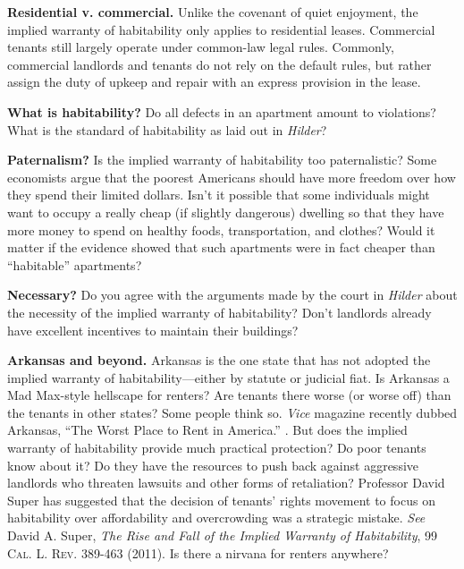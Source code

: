 
\item \textbf{Residential v. commercial.} Unlike the covenant of quiet
enjoyment, the implied warranty of habitability only applies to residential
leases.  Commercial tenants still largely operate under common-law legal rules.
 Commonly, commercial landlords and tenants do not rely on the default rules,
but rather assign the duty of upkeep and repair with an express provision in
the lease. 


\item \textbf{What is habitability?} Do all defects in an apartment
amount to violations?  What is the standard of habitability as laid out in
\textit{Hilder}?  


\item \textbf{Paternalism?} Is the implied warranty of habitability too
paternalistic?  Some economists argue that the poorest Americans should have
more freedom over how they spend their limited dollars.  Isn't it possible that
some individuals might want to occupy a really cheap (if slightly dangerous)
dwelling so that they have more money to spend on healthy foods,
transportation, and clothes?  Would it matter if the evidence showed that such
apartments were in fact cheaper than ``habitable'' apartments?


\item \textbf{Necessary?} Do you agree with the arguments made by the court in
\textit{Hilder} about the necessity of the implied warranty of habitability? 
Don't landlords already have excellent incentives to maintain their buildings?


\item \textbf{Arkansas and beyond.}
Arkansas is the
one
state that has not adopted the implied warranty of habitability---either by
statute or judicial fiat.  Is Arkansas a Mad Max-style hellscape for renters? 
Are tenants there worse (or worse off) than the tenants in other states?  Some
people think so.  \textit{Vice} magazine recently dubbed Arkansas, ``The Worst
Place to Rent in America.'' .
But does the implied
warranty of habitability provide much practical protection?  Do poor tenants
know about it?  Do they have the resources to push back against aggressive
landlords who threaten lawsuits and other forms of retaliation?  Professor
David Super has suggested that the decision of tenants' rights movement to
focus on habitability over affordability and overcrowding was a strategic
mistake.  \textit{See} David A. Super, \textit{The Rise and Fall of the Implied
Warranty of Habitability}, 99 \textsc{Cal. L. Rev}. 389-463 (2011).  Is there a
nirvana for renters anywhere?  


